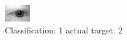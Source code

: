 \begin{figure}[h!]
\begin{center}
\includegraphics[width=0.60\columnwidth]{figures/ID402_class_1_target_2.png}
\end{center}
\caption{ Classification: 1 actual target: 2}
\label{fig:ID402_class_1_target_2}
\end{figure}
